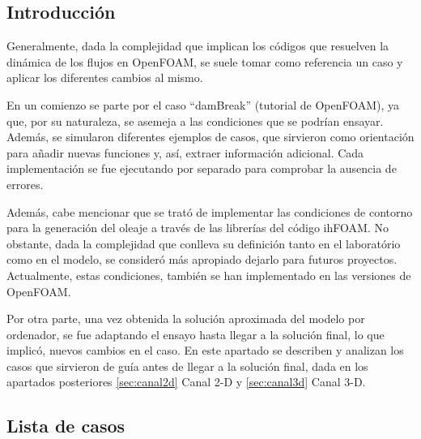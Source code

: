 \subsection{Introducción}\label{header-n2}

Generalmente, dada la complejidad que implican los códigos que resuelven
la dinámica de los flujos en OpenFOAM, se suele tomar como referencia un
caso y aplicar los diferentes cambios al mismo.

En un comienzo se parte por el caso ``damBreak'' (tutorial de OpenFOAM),
ya que, por su naturaleza, se asemeja a las condiciones que se podrían
ensayar. Además, se simularon diferentes ejemplos de casos, que
sirvieron como orientación para añadir nuevas funciones y, así, extraer
información adicional. Cada implementación se fue ejecutando por
separado para comprobar la ausencia de errores.

Además, cabe mencionar que se trató de implementar las condiciones de
contorno para la generación del oleaje a través de las librerías del
código ihFOAM. No obstante, dada la complejidad que conlleva su
definición tanto en el laboratório como en el modelo, se consideró más
apropiado dejarlo para futuros proyectos. Actualmente, estas
condiciones, también se han implementado en las versiones de OpenFOAM.

Por otra parte, una vez obtenida la solución aproximada del modelo por
ordenador, se fue adaptando el ensayo hasta llegar a la solución final,
lo que implicó, nuevos cambios en el caso. En este apartado se describen
y analizan los casos que sirvieron de guía antes de llegar a la solución
final, dada en los apartados posteriores \ref{sec:canal2d} Canal 2-D y \ref{sec:canal3d} Canal 3-D.

\subsection{Lista de casos}\label{header-n13}

